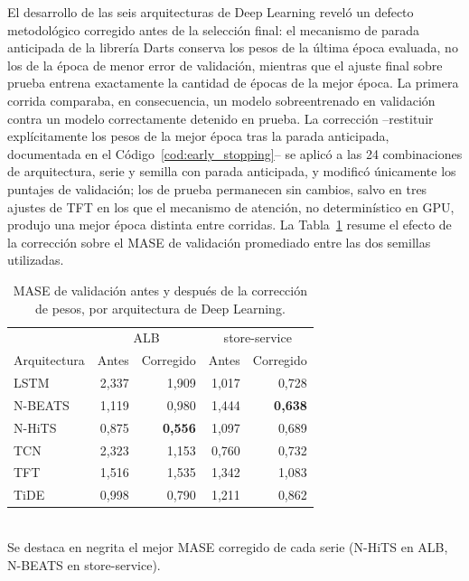 El desarrollo de las seis arquitecturas de Deep Learning reveló un defecto metodológico corregido antes de
la selección final: el mecanismo de parada anticipada de la librería Darts conserva los pesos de la última
época evaluada, no los de la época de menor error de validación, mientras que el ajuste final sobre prueba
entrena exactamente la cantidad de épocas de la mejor época. La primera corrida comparaba, en consecuencia,
un modelo sobreentrenado en validación contra un modelo correctamente detenido en prueba. La corrección
--restituir explícitamente los pesos de la mejor época tras la parada anticipada, documentada en el
Código~\ref{cod:early_stopping}-- se aplicó a las 24 combinaciones de arquitectura, serie y semilla con
parada anticipada, y modificó únicamente los puntajes de validación; los de prueba permanecen sin cambios,
salvo en tres ajustes de TFT en los que el mecanismo de atención, no determinístico en GPU, produjo una
mejor época distinta entre corridas. La Tabla~\ref{tab:dl_correccion} resume el efecto de la corrección
sobre el MASE de validación promediado entre las dos semillas utilizadas.

\begin{table}[htbp]
  \centering
  \caption{MASE de validación antes y después de la corrección de pesos, por arquitectura de Deep Learning.}
  \label{tab:dl_correccion}
  \small
  \begin{tabular}{lrrrr}
    \toprule
    & \multicolumn{2}{c}{ALB} & \multicolumn{2}{c}{store-service} \\
    Arquitectura & Antes & Corregido & Antes & Corregido \\
    \midrule
    LSTM   & 2,337 & 1,909 & 1,017 & 0,728 \\
    N-BEATS & 1,119 & 0,980 & 1,444 & \textbf{0,638} \\
    N-HiTS  & 0,875 & \textbf{0,556} & 1,097 & 0,689 \\
    TCN     & 2,323 & 1,153 & 0,760 & 0,732 \\
    TFT     & 1,516 & 1,535 & 1,342 & 1,083 \\
    TiDE    & 0,998 & 0,790 & 1,211 & 0,862 \\
    \bottomrule
  \end{tabular}
  \\[2pt]
  \footnotesize Se destaca en negrita el mejor MASE corregido de cada serie (N-HiTS en ALB, N-BEATS en
  store-service).
\end{table}


